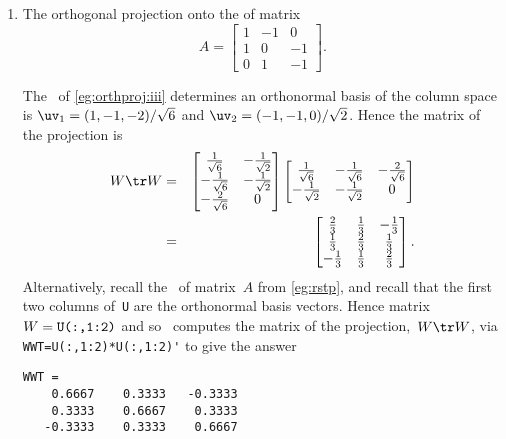 \begin{example}
\begin{enumerate}
\item The orthogonal projection onto the  of matrix
\begin{equation*}
A=\begin{bmatrix} 1&-1&0\\ 1&0&-1\\ 0&1&-1 \end{bmatrix}.
\end{equation*}
\begin{solution} 
The \svd\ of \autoref{eg:orthproj:iii} determines an orthonormal basis of the column space is \(\uv_1=(1,-1,-2)/\sqrt6\) and \(\uv_2=(-1,-1,0)/\sqrt2\).
Hence the matrix of the projection is
\begin{eqnarray*}
W\tr W&=&\begin{bmatrix} \frac1{\sqrt6}&-\frac1{\sqrt2}\\-\frac1{\sqrt6}&-\frac1{\sqrt2}\\-\frac2{\sqrt6}&0 \end{bmatrix}
\begin{bmatrix} \frac1{\sqrt6}&-\frac1{\sqrt6}&-\frac2{\sqrt6}\\ -\frac1{\sqrt2}&-\frac1{\sqrt2}&0\end{bmatrix}
\\&=&\begin{bmatrix} \frac23&\frac13&-\frac13\\\frac13&\frac23&\frac13\\-\frac13&\frac13&\frac23 \end{bmatrix}.
\end{eqnarray*}
Alternatively, recall the \svd\ of matrix~\(A\) from \autoref{eg:rstp}, and recall that the first two columns of~\verb|U| are the orthonormal basis vectors.  
Hence matrix \(W=\verb|U(:,1:2)|\) and so \script\ computes the matrix of the projection,~\(W\tr W\), via \verb|WWT=U(:,1:2)*U(:,1:2)'| to give the answer
\setbox\ajrqrbox\hbox{}%
\marginajrbox%
\begin{verbatim}
WWT =
    0.6667    0.3333   -0.3333
    0.3333    0.6667    0.3333
   -0.3333    0.3333    0.6667
\end{verbatim}
\end{solution}



\end{enumerate}
\end{example}
